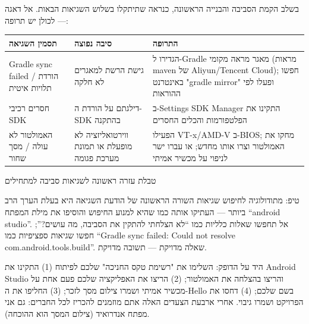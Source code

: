 
בשלב הקמת הסביבה והבנייה הראשונה, כנראה שתיתקלו בשלוש השגיאות הבאות. אל דאגה — לכולן יש תרופה:

\begin{center}
\begin{tabularx}{\linewidth}{|X|X|X|}
\hline
\textbf{תסמין השגיאה} & \textbf{סיבה נפוצה} & \textbf{התרופה} \tabularnewline
\hline
Gradle sync failed / הורדת תלויות איטית & גישת הרשת למאגרים לא חלקה & הגדירו ל-Gradle מאגר מראה מקומי (מראות maven של Aliyun/Tencent Cloud); חפשו באינטרנט "gradle mirror" ופעלו לפי ההוראות \tabularnewline
חסרים רכיבי SDK & דילגתם על הורדת ה-SDK בהתקנה & ב-Settings SDK Manager התקינו את הפלטפורמות והכלים החסרים \tabularnewline
האמולטור לא עולה / מסך שחור & ווירטואליזציה לא מופעלת או תמונת מערכת פגומה & הפעילו VT-x/AMD-V ב-BIOS; מחקו את האמולטור וצרו אותו מחדש; או עברו ישר לניפוי על מכשיר אמיתי \tabularnewline
\hline
\end{tabularx}
\end{center}

\begin{center}\small\color{gray}טבלת עזרה ראשונה לשגיאות סביבה למתחילים\end{center}

\begin{tcbinfo}{טיפ: מתודולוגיה לחיפוש שגיאות}
השורה הראשונה של הודעת השגיאה היא בעלת הערך הרב ביותר — העתיקו אותה כמו שהיא למנוע החיפוש והוסיפו את מילת המפתח “android studio”. אל תחפשו שאלות כלליות כמו “לא הצלחתי להתקין את הסביבה, מה עושים?”; חפשו שגיאות ספציפיות כמו “Gradle sync failed: Could not resolve com.android.tools.build”. שאלה מדויקת — תשובה מדויקת.

\end{tcbinfo}

\begin{tcbpractice}{היד על הדופק: השלימו את "רשימת טקס החניכה" שלכם לפיתוח}
(1) התקינו את Android Studio והריצו בהצלחה את האמולטור; (2) הריצו את האפליקציה שלכם פעם אחת על מכשיר אמיתי ושמרו צילום מסך לזכר; (3) החליפו את ה-Hello בשם שלכם; (4) דחסו את הפרויקט ושמרו גיבוי. אחרי ארבעת הצעדים האלה אתם מוזמנים להכריז לכל החברים: גם אני מפתח אנדרואיד (צילום המסך הוא ההוכחה).

\end{tcbpractice}

